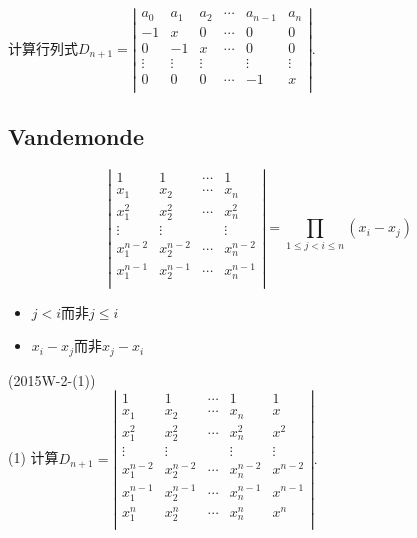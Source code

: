 \documentclass[lang=cn,newtx,10pt,scheme=chinese]{elegantbook}
\begin{document}
\begin{exercise}
	计算行列式$D_{n+1} = 
	\left|
	\begin{array}{cccccc}
		a_0 	& a_1		& a_2 		& \cdots	& a_{n-1}	& a_n		\\
	  	-1		& x			& 0    		& \cdots	& 0			& 0  		\\
	  	0		& -1		& x			& \cdots	& 0			& 0			\\
	  	\vdots	& \vdots 	& \vdots  	&			& \vdots	& \vdots 	\\
		0   	& 0			& 0			& \cdots	& -1		& x			\\
	\end{array}
	\right|
	.
	$
\end{exercise}

\subsection{Vandemonde}

$$
\left|
\begin{array}{ccccc}
    1         & 1         & \cdots & 1         \\
    x_1       & x_2       & \cdots & x_n       \\
    x_1^2     & x_2^2     & \cdots & x_n^2     \\
    \vdots    & \vdots    &        & \vdots    \\
    x_1^{n-2} & x_2^{n-2} & \cdots & x_n^{n-2} \\
    x_1^{n-1} & x_2^{n-1} & \cdots & x_n^{n-1} \\
\end{array}
\right|
=
\prod_{1 \le j < i \le n}(x_i - x_j)
$$
\begin{itemize}
    \item $j < i$而非$j \le i$
    \item $x_i - x_j$而非$x_j - x_i$
\end{itemize}

\begin{example}
  (2015W-2-(1)) \\
  (1) 计算$D_{n+1} = 
  \left|
    \begin{array}{cccccc}
        1         & 1         & \cdots & 1          & 1       \\
        x_1       & x_2       & \cdots & x_n        & x       \\
        x_1^2     & x_2^2     & \cdots & x_n^2      & x^2     \\
        \vdots    & \vdots    &        & \vdots     & \vdots  \\
        x_1^{n-2} & x_2^{n-2} & \cdots & x_n^{n-2}  & x^{n-2} \\
        x_1^{n-1} & x_2^{n-1} & \cdots & x_n^{n-1}  & x^{n-1} \\
        x_1^n     & x_2^n     & \cdots & x_n^n      & x^n     \\
    \end{array}
  \right|
  .
  $
\end{example}
\end{document}
